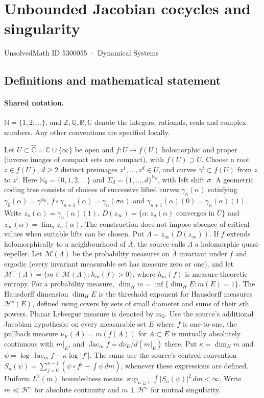 \documentclass[11pt]{article}
\begin{document}
\setcounter{section}{5300054}
\section{Unbounded Jacobian cocycles and singularity}\label{5300055}
{\small\sffamily UnsolvedMath ID 5300055 · Dynamical Systems}
\subsection{Definitions and mathematical statement}

\paragraph{Shared notation.}$\mathbb N=\{1,2,\ldots\}$, and $\mathbb Z,\mathbb Q,\mathbb R,\mathbb C$ denote the integers, rationals, reals and complex numbers. Any other conventions are specified locally.


Let $U\subset\widehat{\mathbb C}=\mathbb C\cup\{\infty\}$ be open and $f:U\to f(U)$ holomorphic and proper (inverse images of compact sets are compact), with $f(U)\supset U$. Choose a root $z\in f(U)$, $d\geq2$ distinct preimages $z^1,\ldots,z^d\in U$, and curves $\gamma^i\subset f(U)$ from $z$ to $z^i$. Here $\mathbb N_0=\{0,1,2,\ldots\}$ and $\Sigma_d=\{1,\ldots,d\}^{\mathbb N_0}$, with left shift $\sigma$. A geometric coding tree consists of choices of successive lifted curves $\gamma_n(\alpha)$ satisfying $\gamma_0(\alpha)=\gamma^{\alpha_0}$, $f\circ\gamma_{n+1}(\alpha)=\gamma_n(\sigma\alpha)$ and $\gamma_{n+1}(\alpha)(0)=\gamma_n(\alpha)(1)$. Write $z_n(\alpha)=\gamma_n(\alpha)(1)$, $D(z_\infty)=\{\alpha:z_n(\alpha)\text{ converges in }\overline U\}$ and $z_\infty(\alpha)=\lim_n z_n(\alpha)$. The construction does not impose absence of critical values when suitable lifts can be chosen. Put $\Lambda=z_\infty(D(z_\infty))$. If $f$ extends holomorphically to a neighbourhood of $\overline\Lambda$, the source calls $\Lambda$ a holomorphic quasi-repeller. Let $\mathcal M(\Lambda)$ be the probability measures on $\overline\Lambda$ invariant under $f$ and ergodic (every invariant measurable set has measure zero or one), and let $\mathcal M^+(\Lambda)=\{m\in\mathcal M(\Lambda):h_m(f)>0\}$, where $h_m(f)$ is measure-theoretic entropy. For a probability measure, $\dim_Hm=\inf\{\dim_HE:m(E)=1\}$. The Hausdorff dimension $\dim_H E$ is the threshold exponent for Hausdorff measures $\mathcal H^s(E)$, defined using covers by sets of small diameter and sums of their $s$th powers. Planar Lebesgue measure is denoted by $m_2$. Use the source's additional Jacobian hypothesis: on every measurable set $E$ where $f$ is one-to-one, the pullback measure $\nu_E(A)=m(f(A))$ for $A\subset E$ is mutually absolutely continuous with $m|_E$, and $\operatorname{Jac}_m f=d\nu_E/d(m|_E)$ there. Put $\kappa=\dim_Hm$ and $\psi=\log\operatorname{Jac}_mf-\kappa\log|f'|$. The sums use the source's centred convention $S_n(\psi)=\sum_{j=0}^{n-1}(\psi\circ f^j-\int\psi\,dm)$, whenever these expressions are defined. Uniform $L^2(m)$ boundedness means $\sup_{n\geq1}\int|S_n(\psi)|^2\,dm<\infty$. Write $m\ll\mathcal H^\kappa$ for absolute continuity and $m\perp\mathcal H^\kappa$ for mutual singularity.
\end{document}
